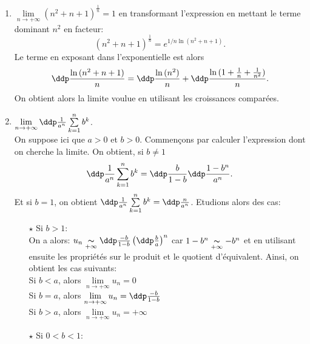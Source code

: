 \begin{correction}
\begin{enumerate}
\item
$\lim \limits_{n\to +\infty}(n^2+n+1)^{\frac{1}{n}}=1$ en transformant l'expression en mettant le terme dominant $n^2$ en facteur:
$$(n^2+n+1)^{\frac{1}{n}}=e^{1/n\ln{(n^2+n+1)}}.$$
Le terme en exposant dans l'exponentielle est alors
$$\ddp\frac{\ln{(n^2+n+1)}}{n}=\ddp\frac{\ln{(n^2)}}{n}+\ddp\frac{\ln{(1+\frac{1}{n}+\frac{1}{n^2})}}{n}.$$
On obtient alors la limite voulue en utilisant les croissances compar\'ees.
\item
$\lim \limits_{n\to +\infty}\ddp\frac{1}{a^n}\sum\limits_{k=1}^n b^k$.\\
\noindent On suppose ici que $a>0$ et $b>0$. Commen\c{c}ons par calculer l'expression dont on cherche la limite. On obtient, si $b\not= 1$
$$\ddp\frac{1}{a^n}\sum\limits_{k=1}^n b^k=\ddp\frac{b}{1-b}\ddp\frac{1-b^n}{a^n}.$$
Et si $b=1$, on obtient $\ddp\frac{1}{a^n}\sum\limits_{k=1}^n b^k=\ddp\frac{n}{a^n}$.
Etudions alors des cas:
\begin{itemize}
\item[$\star$] Si $b>1$:\\
\noindent On a alors: $u_n\underset{+\infty}{\thicksim} \ddp\frac{-b}{1-b} \left( \ddp\frac{b}{a} \right)^n$ car $1-b^n\underset{+\infty}{\thicksim} -b^n$ et en utilisant ensuite les propri\'et\'es sur le produit et le quotient d'\'equivalent.
Ainsi, on obtient les cas suivants:\\
\noindent Si $b<a$, alors $\lim\limits_{n\to +\infty} u_n=0$\\
\noindent Si $b=a$, alors $\lim\limits_{n\to +\infty} u_n=\ddp\frac{-b}{1-b}$\\
\noindent Si $b>a$, alors $\lim\limits_{n\to +\infty} u_n=+\infty$\\
\item[$\star$] Si $0<b<1$:\\

\end{itemize}
\end{enumerate}
\end{correction}
